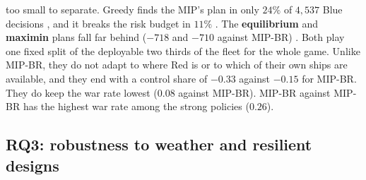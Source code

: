\begin{addblock}
{too small to separate}. Greedy finds the MIP's plan in only $24\%$ of $4{,}537$ Blue decisions
, and it breaks the risk budget in $11\%$ .
The \textbf{equilibrium} and \textbf{maximin} plans fall far behind ($-718$ and $-710$ against MIP-BR) . Both play one fixed split of the deployable two thirds of the fleet for the whole game. Unlike MIP-BR, they do not
adapt to where Red is or to which of their own ships are available, and they end with a control share of $-0.33$
against $-0.15$ for MIP-BR. They do keep the war rate lowest ($0.08$ against MIP-BR). MIP-BR against MIP-BR has the highest war rate among the strong
policies ($0.26$).

\subsection{RQ3: robustness to weather and resilient designs}

\end{addblock}
